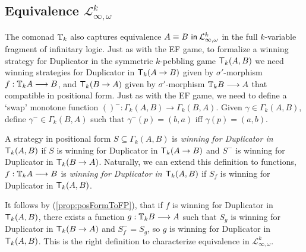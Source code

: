 \subsection{Equivalence $\mathcal{L}^{k}_{\infty,\omega}$}
The comonad ${\mathbb{T}_{k}}$ also captures equivalence ${A \equiv B \ \mathsf{in}\: \mathcal{L}^{k}_{\infty,\omega}}$ in the full $k$-variable fragment of infinitary logic. Just as with the EF game, to formalize a winning strategy for Duplicator in the symmetric $k$-pebbling game ${\mathsf{T}_{k}(A,B)}$ we need winning strategies for Duplicator in ${\mathsf{T}_{k}(A \rightarrow B)}$ given by $\sigma'$-morphism $f:{\mathbb{T}_{k}A} \longrightarrow B$, and ${\mathsf{T}_{k}(B \rightarrow A)}$ given by $\sigma'$-morphism ${\mathbb{T}_{k}B} \longrightarrow A$ that compatible in positional form. Just as with the EF game, we need to define a `swap' monotone function $()^{-}:\Gamma_{k}(A,B) \longrightarrow \Gamma_{k}(B,A)$. Given $\gamma \in \Gamma_{k}(A,B)$, define $\gamma^{-} \in \Gamma_{k}(B,A)$ such that $\gamma^{-}(p) = (b,a)$ iff $\gamma(p) = (a,b)$. 
\begin{defn}
A strategy in positional form $S \subseteq \Gamma_{k}(A,B)$ is \textit{winning for Duplicator in ${\mathsf{T}_{k}(A,B)}$} if $S$ is winning for Duplicator in ${\mathsf{T}_{k}(A \rightarrow B)}$ and $S^{-}$ is winning for Duplicator in ${\mathsf{T}_{k}(B \rightarrow A)}$. Naturally, we can extend this definition to functions, $f:{\mathbb{T}_{k}A} \longrightarrow B$ is \textit{winning for Duplicator in ${\mathsf{T}_{k}(A,B)}$} if $S_{f}$ is winning for Duplicator in ${\mathsf{T}_{k}(A,B)}$.
\end{defn}
It follows by (\ref{prop:posFormToFP}), that if $f$ is winning for Duplicator in ${\mathsf{T}_{k}(A,B)}$, there exists a function $g:{\mathbb{T}_{k}B} \longrightarrow A$ such that $S_{g}$ is winning for Duplicator in ${\mathsf{T}_{k}(B \rightarrow A)}$ and $S_{f}^{-} = S_{g}$, so $g$ is winning for Duplicator in ${\mathsf{T}_{k}(A,B)}$. This is the right definition to characterize equivalence in $\mathcal{L}^{k}_{\infty,\omega}$. 
